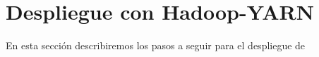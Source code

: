 \chapter{Despliegue con Hadoop-YARN \label{yarn}}

En esta sección describiremos los pasos a seguir para el despliegue de

